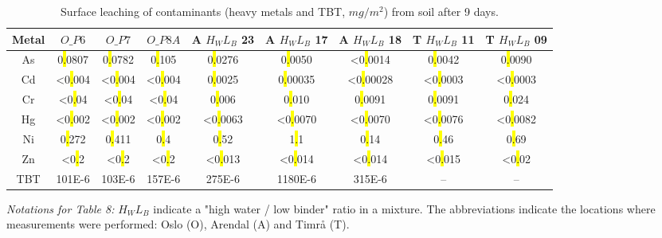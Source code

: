 \documentclass[algorithms,article,submit,pdftex,moreauthors]{Definitions/mdpi}
\begin{document}
\begin{table}[H] 
\begin{threeparttable}
\centering
\caption{Surface leaching of contaminants (heavy metals and TBT, $mg/m^2$) from soil after 9 days.\label{tab07}}
\small
\setlength\tabcolsep{0pt}
\begin{tabularx}{\textwidth}{@{\extracolsep{\fill}} ccccccccc }
\toprule
\textbf{Metal} & \textbf{$O\_P6$} & \textbf{$O\_P7$} & \textbf{$O\_P8A$} & \textbf{A $H_WL_B$ 23} & \textbf{A $H_WL_B$ 17} & \textbf{A $H_WL_B$ 18} & \textbf{T $H_WL_B$ 11} & \textbf{T $H_WL_B$ 09}\\
\midrule
As &  0\hl{.}0807 & 0\hl{.}0782 & 0\hl{.}105 & 0\hl{.}0276 & 0\hl{.}0050 & <0\hl{.}0014 & 0\hl{.}0042 & 0\hl{.}0090 \\
Cd & <0\hl{.}004 & <0\hl{.}004 & <0\hl{.}004 & 0\hl{.}0025 & 0\hl{.}00035 & <0\hl{.}00028 & <0\hl{.}0003 & <0\hl{.}0003 \\
Cr & <0\hl{.}04 & <0\hl{.}04 & <0\hl{.}04 & 0\hl{.}006 & 0\hl{.}010 & 0\hl{.}0091 & 0\hl{.}0091 & 0\hl{.}024 \\
Hg & <0\hl{.}002 & <0\hl{.}002 & <0\hl{.}002 & <0\hl{.}0063 & <0\hl{.}0070 & <0\hl{.}0070 & <0\hl{.}0076 & <0\hl{.}0082 \\
Ni & 0\hl{.}272 & 0\hl{.}411 & 0\hl{.}4 & 0\hl{.}52 & 1\hl{.}1 & 0\hl{.}14 & 0\hl{.}46 & 0\hl{.}69 \\
Zn & <0\hl{.}2 & <0\hl{.}2 & <0\hl{.}2 & <0\hl{.}013 & <0\hl{.}014 & <0\hl{.}014 & <0\hl{.}015 & <0\hl{.}02 \\
TBT & 101E-6 & 103E-6 & 157E-6 & 275E-6 & 1180E-6 & 315E-6 & -- & -- \\
\bottomrule
\end{tabularx}
\begin{tablenotes}
      \small
      	\item \emph{Notations for Table 8:}  $H_WL_B$ indicate a "high water / low binder" ratio in a mixture. The abbreviations indicate the locations where measurements were performed: Oslo (O), Arendal (A) and Timrå (T). 
    \end{tablenotes}
  \end{threeparttable}
\end{table}
\end{document}
